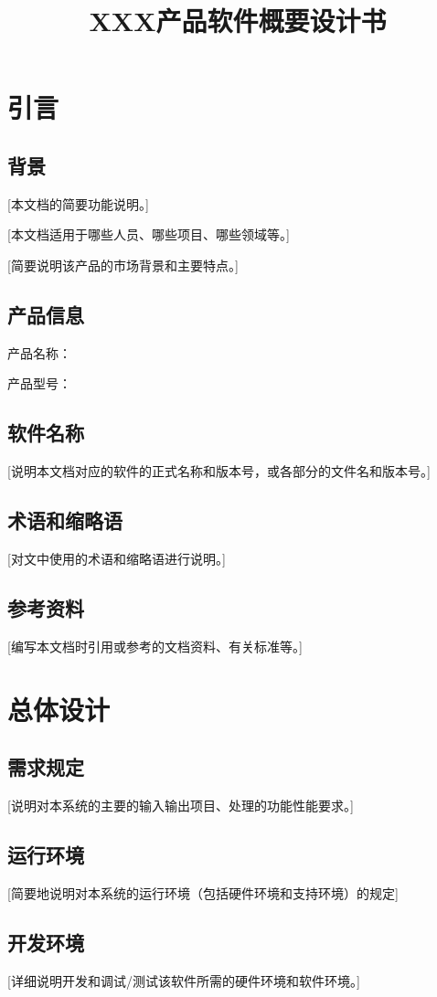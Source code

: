 \documentclass[UTF8]{ctexart}
\title{XXX产品软件概要设计书}
\date{}
\begin{document}
\maketitle  %
\clearpage
\tableofcontents  %
\section{引言}
    \subsection{背景}
   [本文档的简要功能说明。]

	[本文档适用于哪些人员、哪些项目、哪些领域等。]

	[简要说明该产品的市场背景和主要特点。]
	\subsection{产品信息}
		产品名称：
		
		产品型号：
	\subsection{软件名称}
		[说明本文档对应的软件的正式名称和版本号，或各部分的文件名和版本号。]
	\subsection{术语和缩略语}
		[对文中使用的术语和缩略语进行说明。]
	
	\subsection{参考资料}
		[编写本文档时引用或参考的文档资料、有关标准等。]
\section{总体设计}
	\subsection{需求规定}
		[说明对本系统的主要的输入输出项目、处理的功能性能要求。]
	\subsection{运行环境}
		[简要地说明对本系统的运行环境（包括硬件环境和支持环境）的规定]
	\subsection{开发环境}
		[详细说明开发和调试/测试该软件所需的硬件环境和软件环境。]
\end{document}
